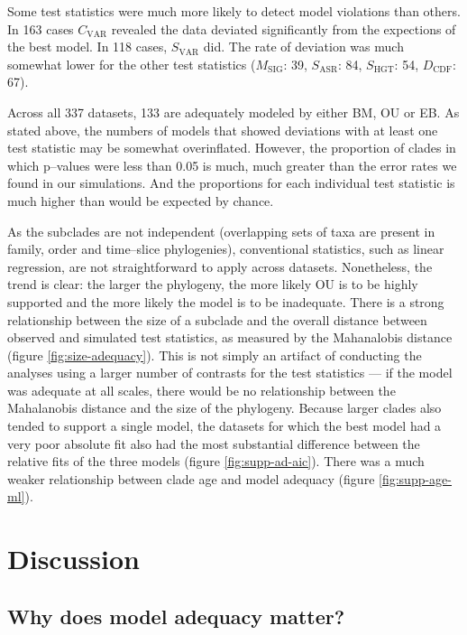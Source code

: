 \documentclass[a4paper,11pt]{article}
\begin{document}
Some test statistics were much more likely to detect model violations than others. In 163 cases $C_{\text{VAR}}$ revealed the data deviated significantly from the expections of the best model. In 118 cases, $S_{\text{VAR}}$ did. The rate of deviation was much somewhat lower for the other test statistics ($M_{\text{SIG}}$: 39, $S_{\text{ASR}}$: 84, $S_{\text{HGT}}$: 54, $D_{\text{CDF}}$: 67).

Across all 337 datasets, 133 are adequately modeled by either BM, OU or EB. As stated above, the numbers of models that showed deviations with at least one test statistic may be somewhat overinflated. However, the proportion of clades in which p--values were less than 0.05 is much, much greater than the error rates we found in our simulations. And the proportions for each individual test statistic is much higher than would be expected by chance. 

As the subclades are not independent (overlapping sets of taxa are present in family, order and time--slice phylogenies), conventional statistics, such as linear regression, are not straightforward to apply across datasets. Nonetheless, the trend is clear: the larger the phylogeny, the more likely OU is to be highly supported and the more likely the model is to be inadequate. There is a strong relationship between the size of a subclade and the overall distance between observed and simulated test statistics, as measured by the Mahanalobis distance (figure \ref{fig:size-adequacy}). This is not simply an artifact of conducting the analyses using a larger number of contrasts for the test statistics --- if the model was adequate at all scales, there would be no relationship between the Mahalanobis distance and the size of the phylogeny. Because larger clades also tended to support a single model, the datasets for which the best model had a very poor absolute fit also had the most substantial difference between the relative fits of the three models (figure \ref{fig:supp-ad-aic}). There was a much weaker relationship between clade age and model adequacy (figure \ref{fig:supp-age-ml}).

\section{Discussion}

\subsection{Why does model adequacy matter?}
\end{document}
